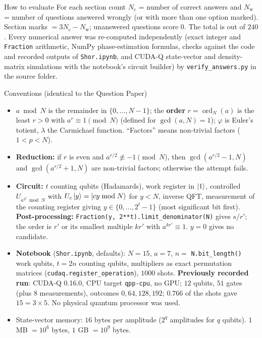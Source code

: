 \documentclass[11pt,a4paper]{article}
\begin{document}
\begin{infobox}{How to evaluate}
For each section count $N_{\mathrm c}$ = number of correct answers and $N_{\mathrm w}$ = number of questions answered wrongly (or with more than one option marked). Section marks $= 3N_{\mathrm c} - N_{\mathrm w}$; unanswered questions score $0$. The total is out of $240$.
Every numerical answer was re-computed independently (exact integer and \texttt{Fraction} arithmetic, NumPy phase-estimation formulas, checks against the code and recorded outputs of \texttt{Shor.ipynb}, and CUDA-Q state-vector and density-matrix simulations with the notebook's circuit builder) by
\texttt{verify\_answers.py} in the source folder.
\end{infobox}
\begin{infobox}{Conventions (identical to the Question Paper)}
\footnotesize
\begin{itemize}[leftmargin=1.2em, itemsep=1pt, topsep=2pt]
\item $a \bmod N$ is the remainder in $\{0, \dots, N - 1\}$; the \textbf{order} $r = \operatorname{ord}_N(a)$ is the least $r > 0$ with $a^r \equiv 1 \pmod N$ (defined for $\gcd(a, N) = 1$);
      $\varphi$ is Euler's totient, $\lambda$ the Carmichael function. ``Factors'' means non-trivial factors ($1 < p < N$).
\item \textbf{Reduction:} if $r$ is even and $a^{r/2} \not\equiv -1 \pmod N$, then $\gcd(a^{r/2} - 1, N)$ and $\gcd(a^{r/2} + 1, N)$ are non-trivial factors; otherwise the attempt fails.
\item \textbf{Circuit:} $t$ counting qubits (Hadamards), work register in $\ket1$, controlled $U_{a^{2^j} \bmod N}$ with $U_c\ket y = \ket{cy \bmod N}$ for $y < N$, inverse QFT, measurement of the
      counting register giving $y \in \{0, \dots, 2^t - 1\}$ (most significant bit first). \textbf{Post-processing:} \texttt{Fraction(y, 2**t).limit\_denominator(N)} gives $s/r'$;
      the order is $r'$ or its smallest multiple $kr'$ with $a^{kr'} \equiv 1$. $y = 0$ gives no candidate.
\item \textbf{Notebook} (\texttt{Shor.ipynb}, defaults): $N = 15$, $a = 7$, $n = $ \texttt{N.bit\_length()} work qubits, $t = 2n$ counting qubits, multipliers as exact
      permutation matrices (\texttt{cudaq.register\_operation}), $1000$ shots. \textbf{Previously recorded run}: CUDA-Q 0.16.0, CPU target \texttt{qpp-cpu}, no GPU; $12$ qubits,
      $51$ gates (plus $8$ measurements), outcomes $0, 64, 128, 192$; $0.766$ of the shots gave $15 = 3 \times 5$. No physical quantum processor was used.
\item State-vector memory: $16$ bytes per amplitude ($2^q$ amplitudes for $q$ qubits). $1$ MB $= 10^6$ bytes, $1$ GB $= 10^9$ bytes.
\end{itemize}
\end{infobox}
\newpage
\end{document}
